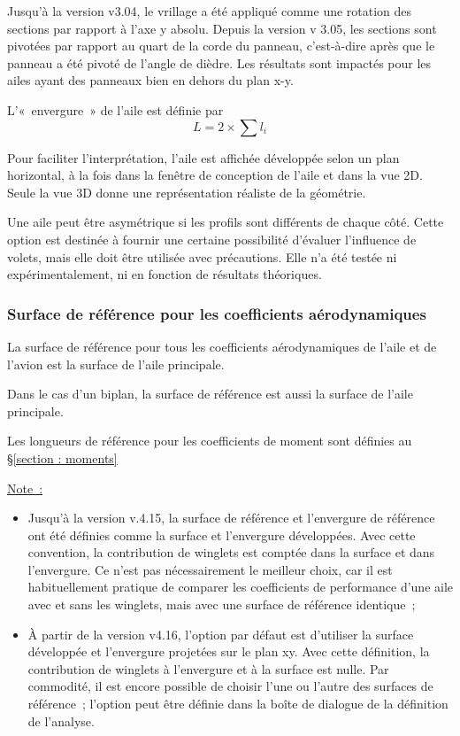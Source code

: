 \documentclass[a4paper,twoside,12pt,dvips]{article}
\begin{document}
Jusqu’à la version v3.04, le vrillage a été appliqué comme une rotation des 
sections par rapport à l’axe y absolu. Depuis la version v 3.05, les sections 
sont pivotées par rapport au quart de la corde du panneau, c’est-à-dire
après que le panneau a été pivoté de l’angle de dièdre. Les résultats
sont impactés pour les ailes ayant des panneaux bien en dehors du plan x-y.

L’«~envergure~» de l’aile est définie par $$L=2 \times \sum l_i$$

Pour faciliter l’interprétation, l’aile est affichée développée selon un 
plan horizontal, à la fois dans la fenêtre de conception de l’aile et dans
la vue 2D. Seule la vue 3D donne une représentation réaliste de la géométrie. 

Une aile peut être asymétrique si les profils sont différents de chaque côté.
Cette option est destinée à fournir une certaine possibilité d’évaluer l’influence de volets, mais elle doit être utilisée avec précautions. Elle n’a
été testée ni expérimentalement, ni en fonction de résultats théoriques.

\subsubsection{Surface de référence pour les coefficients aérodynamiques}

La surface de référence pour tous les coefficients aérodynamiques de l’aile
et de l’avion est la surface de l’aile principale.

Dans le cas d’un biplan, la surface de référence est aussi la surface de
l’aile principale.

Les longueurs de référence pour les coefficients de moment sont définies au 
\S\ref{section : moments}

\underline{Note~: }
\begin{itemize}
	\item Jusqu’à la version v.4.15, la surface de référence et l’envergure de 
	référence ont été définies comme la surface et l’envergure développées. Avec 
	cette convention, la contribution de winglets est comptée dans la surface et
	dans l’envergure. Ce n’est pas nécessairement le meilleur choix, car il est 
	habituellement pratique de comparer les coefficients de performance d’une 
	aile avec et sans les winglets, mais avec une surface de référence 
	identique~; 
	\item À partir de la version v4.16, l’option par défaut est d’utiliser la 
	surface développée et l’envergure projetées sur le plan xy. Avec cette 
	définition, la contribution de winglets à l’envergure et à la surface est
	nulle. Par commodité, il est encore possible de choisir l’une ou l’autre 
	des surfaces de référence~; l’option peut être définie dans la boîte de 
	dialogue de la définition de l’analyse.
\end{itemize}
\end{document}

